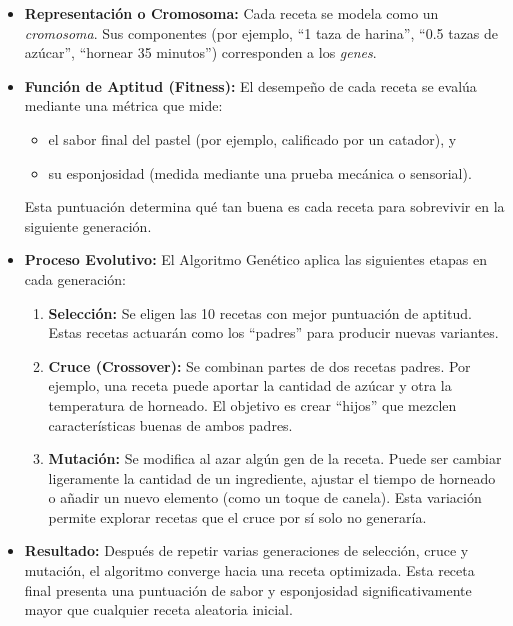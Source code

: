 \documentclass[letterpaper,12pt]{article}
\begin{document}
\begin{itemize}
\begin{itemize}
        \item \textbf{Representación o Cromosoma:}  
        Cada receta se modela como un \textit{cromosoma}.  
        Sus componentes (por ejemplo, ``1 taza de harina'', ``0.5 tazas de azúcar'', ``hornear 35 minutos'') 
        corresponden a los \textit{genes}.
    
        \item \textbf{Función de Aptitud (Fitness):}  
        El desempeño de cada receta se evalúa mediante una métrica que mide:
        \begin{itemize}
            \item el sabor final del pastel (por ejemplo, calificado por un catador), y
            \item su esponjosidad (medida mediante una prueba mecánica o sensorial).
        \end{itemize}
        Esta puntuación determina qué tan buena es cada receta para sobrevivir en la siguiente generación.
    
        \item \textbf{Proceso Evolutivo:}
        El Algoritmo Genético aplica las siguientes etapas en cada generación:
    
        \begin{enumerate}
            \item \textbf{Selección:}  
            Se eligen las 10 recetas con mejor puntuación de aptitud.  
            Estas recetas actuarán como los ``padres'' para producir nuevas variantes.
    
            \item \textbf{Cruce (Crossover):}  
            Se combinan partes de dos recetas padres.  
            Por ejemplo, una receta puede aportar la cantidad de azúcar y otra la temperatura de horneado.  
            El objetivo es crear ``hijos'' que mezclen características buenas de ambos padres.
    
            \item \textbf{Mutación:}  
            Se modifica al azar algún gen de la receta.  
            Puede ser cambiar ligeramente la cantidad de un ingrediente, ajustar el tiempo de horneado
            o añadir un nuevo elemento (como un toque de canela).  
            Esta variación permite explorar recetas que el cruce por sí solo no generaría.
        \end{enumerate}
    
        \item \textbf{Resultado:}  
        Después de repetir varias generaciones de selección, cruce y mutación, el algoritmo converge hacia una receta optimizada.  
        Esta receta final presenta una puntuación de sabor y esponjosidad significativamente mayor que cualquier receta aleatoria inicial.
    \end{itemize}


\end{itemize}
\end{document}
